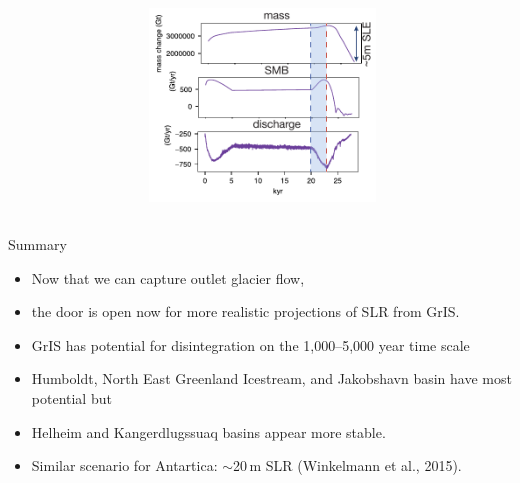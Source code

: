 \documentclass[hide notes,intlimits]{beamer}
\begin{document}
\begin{frame}
  \begin{columns}
    \column[T]{5.5cm}
    \begin{figure}
    \end{figure}
    \column[T]{6cm}
    \vspace{3em}
    \begin{figure}
      \includegraphics[width=6cm]{ts_glacial}
  \end{figure}
\end{columns}
\end{frame}

\begin{frame}{Summary}
  \begin{itemize}
  \item Now that we can capture outlet glacier flow,
  \item the door is open now for more realistic projections of SLR from GrIS.
  \item GrIS has potential for disintegration on the 1,000--5,000 year time scale
  \item Humboldt, North East Greenland Icestream, and Jakobshavn basin have most potential but
  \item Helheim and Kangerdlugssuaq basins appear more stable.
  \item Similar scenario for Antartica: $\sim$20\,m SLR (Winkelmann et al., 2015).
  \end{itemize}
\end{frame}
\end{document}
